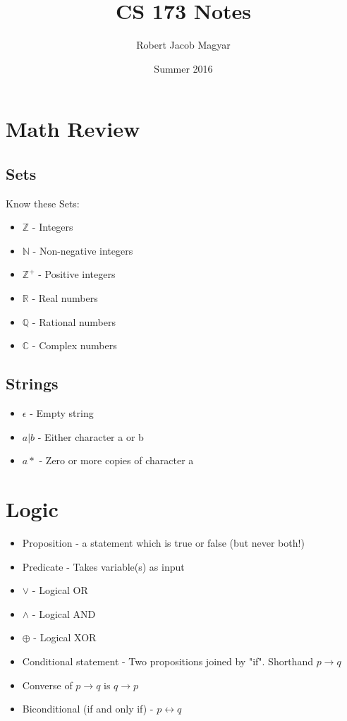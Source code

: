 \documentclass{article}
\begin{document}
\title{CS 173 Notes}
\author{Robert Jacob Magyar}
\date{Summer 2016}
\maketitle

\section*{Math Review}
\subsection*{Sets}
Know these Sets:

\begin{itemize}
\item $\mathbb{Z}$ - Integers
\item $\mathbb{N}$ - Non-negative integers
\item $\mathbb{Z}^+$ - Positive integers
\item $\mathbb{R}$ - Real numbers
\item $\mathbb{Q}$ - Rational numbers
\item $\mathbb{C}$ - Complex numbers
\end{itemize}
\subsection*{Strings}

\begin{itemize}
\item $\epsilon$ - Empty string 
\item $a | b$ - Either character a or b 
\item $a*$ - Zero or more copies of character a 
\end{itemize}

\section*{Logic}
\begin{itemize}
\item Proposition - a statement which is true or false (but never both!)
\item Predicate - Takes variable(s) as input
\item $\lor$ - Logical OR
\item $\land$ - Logical AND
\item $\oplus$ - Logical XOR
\item Conditional statement - Two propositions joined by "if". Shorthand $p \rightarrow q$
\item Converse of $p \rightarrow q$ is $q \rightarrow p$
\item Biconditional (if and only if) - $p \leftrightarrow q$
\end{itemize}
\end{document}
